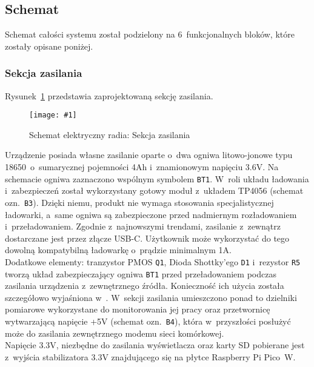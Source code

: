 \documentclass[polish]{aghengthesis}
\newcommand{\imgint}[4]{
	\begin{figure}[{#4}]
		\centering
		\texttt{[image: \#1]}
		\caption{#2}
		\label{#1}
	\end{figure}
}
\newcommand{\imgh}[3]{\imgint{#1}{#2}{#3}{H}}
\begin{document}
		\subsection{Schemat}

			Schemat całości systemu został podzielony na 6~funkcjonalnych bloków, które zostały opisane poniżej.
			
			\subsubsection{Sekcja zasilania}
				Rysunek~\ref{3/hw_kicad_sch_power} przedstawia zaprojektowaną sekcję zasilania.
				\imgh{3/hw_kicad_sch_power}{Schemat elektryczny radia: Sekcja zasilania}{0.95}
				
				Urządzenie posiada własne zasilanie oparte o~dwa ogniwa litowo-jonowe typu 18650~o~sumarycznej pojemności 4Ah i~znamionowym napięciu 3.6V. Na schemacie ogniwa zaznaczono wspólnym symbolem \lstinline|BT1|. W~roli układu ładowania i~zabezpieczeń został wykorzystany gotowy moduł z~układem TP4056\textsuperscript{\cite{hw_chg}} (schemat ozn.~\lstinline|B3|). Dzięki niemu, produkt nie wymaga stosowania specjalistycznej ładowarki, a~same ogniwa są zabezpieczone przed nadmiernym rozładowaniem i~przeładowaniem. Zgodnie z~najnowszymi trendami, zasilanie z~zewnątrz dostarczane jest przez złącze USB-C. Użytkownik może wykorzystać do tego dowolną kompatybilną ładowarkę o~prądzie minimalnym 1A.
				$ $\\
				
				Dodatkowe elementy: tranzystor PMOS \lstinline|Q1|, Dioda Shottky'ego \lstinline|D1| i~rezystor \lstinline|R5| tworzą układ zabezpieczający ogniwa \lstinline|BT1| przed przeładowaniem podczas  zasilania urządzenia z~zewnętrznego źródła. Konieczność ich użycia została szczegółowo wyjaśniona w~\cite{hw_load_sw}. W~sekcji zasilania umieszczono ponad to dzielniki pomiarowe wykorzystane do monitorowania jej pracy oraz przetwornicę wytwarzającą napięcie +5V (schemat ozn.~\lstinline|B4|), która w~przyszłości posłużyć może do zasilania zewnętrznego modemu sieci komórkowej.
				$ $\\
				
				Napięcie 3.3V, niezbędne do zasilania wyświetlacza oraz karty SD pobierane jest z~wyjścia stabilizatora 3.3V znajdującego się na płytce Raspberry Pi Pico~W.
				
\end{document}

